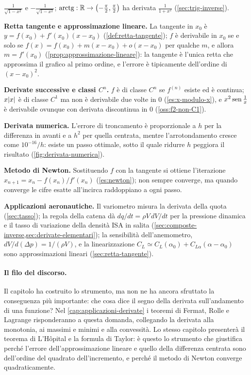 \begin{puntichiave}
$\frac1{\sqrt{1-x^{2}}}$ e $-\frac1{\sqrt{1-x^{2}}}$;
$\operatorname{arctg}:\mathbb{R}\to\bigl(-\frac\pi2,\frac\pi2\bigr)$ ha derivata $\frac1{1+x^{2}}$
(\cref{sec:trig-inverse}).
\item \textbf{Retta tangente e approssimazione lineare.} La tangente in $x_{0}$ è
$y=f(x_{0})+f'(x_{0})(x-x_{0})$ (\cref{def:retta-tangente}); $f$ è derivabile in $x_{0}$
se e solo se $f(x)=f(x_{0})+m(x-x_{0})+o(x-x_{0})$ per qualche $m$, e allora $m=f'(x_{0})$
(\cref{prop:approssimazione-lineare}): la tangente è l'unica retta che approssima il
grafico al primo ordine, e l'errore è tipicamente dell'ordine di $(x-x_{0})^{2}$.
\item \textbf{Derivate successive e classi $C^{n}$.} $f$ è di classe $C^{n}$ se $f^{(n)}$
esiste ed è continua; $x\lvert x\rvert$ è di classe $C^{1}$ ma non è derivabile due volte in $0$
(\cref{es:x-modulo-x}), e $x^{2}\operatorname{sen}\frac1x$ è derivabile ovunque con derivata discontinua
in $0$ (\cref{oss:f2-non-C1}).
\item \textbf{Derivata numerica.} L'errore di troncamento è proporzionale a $h$ per la
differenza in avanti e a $h^{2}$ per quella centrata, mentre l'arrotondamento cresce
come $10^{-16}/h$: esiste un passo ottimale, sotto il quale ridurre $h$ peggiora il
risultato (\cref{fig:derivata-numerica}).
\item \textbf{Metodo di Newton.} Sostituendo $f$ con la tangente si ottiene l'iterazione
$x_{n+1}=x_{n}-f(x_{n})/f'(x_{n})$ (\cref{es:newton}); non sempre converge, ma quando
converge le cifre esatte all'incirca raddoppiano a ogni passo.
\item \textbf{Applicazioni aeronautiche.} Il variometro misura la derivata della quota
(\cref{sec:tasso}); la regola della catena dà $dq/dt=\rho V\,dV/dt$ per la
pressione dinamica e il tasso di variazione della densità ISA in salita
(\cref{sec:composte-inverse,sec:derivate-elementari}); la sensibilità
dell'anemometro, $dV/d(\Delta p)=1/(\rho V)$, e la linearizzazione
$C_{L}\simeq C_{L}(\alpha_{0})+C_{L\alpha}(\alpha-\alpha_{0})$ sono approssimazioni lineari
(\cref{sec:retta-tangente}).
\end{puntichiave}

\paragraph{Il filo del discorso.} Il capitolo ha costruito lo strumento, ma non ne ha
ancora sfruttato la conseguenza più importante: che cosa dice il segno della derivata
sull'andamento di una funzione? Nel \cref{cap:applicazioni-derivate} i teoremi di Fermat,
Rolle e Lagrange risponderanno a questa domanda, collegando la derivata alla monotonia, ai
massimi e minimi e alla convessità. Lo stesso capitolo presenterà il teorema di
L'Hôpital e la formula di Taylor: è questo lo strumento che giustifica perché l'errore
dell'approssimazione lineare e quello della differenza centrata sono dell'ordine del
quadrato dell'incremento, e perché il metodo di Newton converge quadraticamente.
